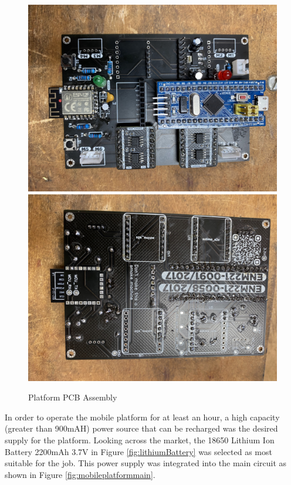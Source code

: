 \begin{figure}[H]
\centering
    \includegraphics[scale = 0.07]{Figures/pcbFINALfront.jpg}
    \includegraphics[scale = 0.07]{Figures/pcbFINALback.jpg}
    \caption{Platform \ac{PCB} Assembly}
    \label{fig:mainPCBAssembly}
\end{figure}

\par
In order to operate the mobile platform for at least an hour, a high capacity (greater than 900mAH) power source that can be recharged was the desired supply for the platform. Looking across the market, the 18650 Lithium Ion Battery 2200mAh 3.7V in Figure \ref{fig:lithiumBattery} was selected as most suitable for the job. This power supply was integrated into the main circuit as shown in Figure \ref{fig:mobileplatformmain}. 

